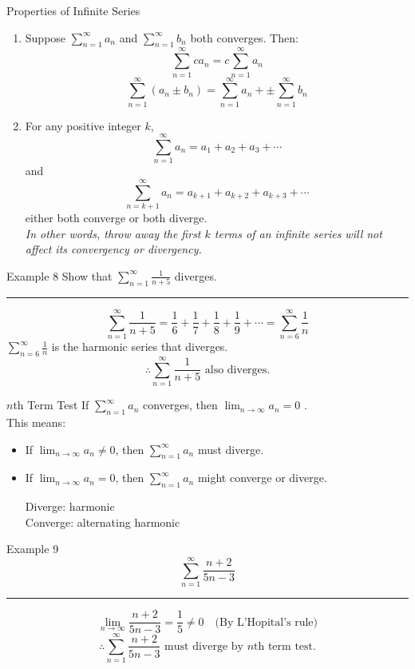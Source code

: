 \documentclass[12pt,a4paper]{article}
\begin{document}
\begin{thm}{Properties of Infinite Series}
	\begin{enumerate}
		\item Suppose $\displaystyle\sum^\infty_{n=1}a_n$ and $\displaystyle\sum^\infty_{n=1}b_n$ both converges. Then: $$\sum^\infty_{n=1}ca_n=c\sum^\infty_{n=1}a_n$$ $$\sum^\infty_{n=1}(a_n\pm b_n)=\sum^\infty_{n=1}a_n+\pm\sum^\infty_{n=1}b_n$$
		\item For any positive integer $k$, $$\sum^\infty_{n=1}a_n=a_1+a_2+a_3+\cdots$$ and $$\sum^\infty_{n=k+1}a_n=a_{k+1}+a_{k+2}+a_{k+3}+\cdots$$ either both converge or both diverge. \\
		\textit{In other words, throw away the first $k$ terms of an infinite series will not affect its convergency or divergency. }
	\end{enumerate}
\end{thm}
\begin{eg}{Example 8}
	Show that $\displaystyle\sum_{n=1}^\infty\frac{1}{n+5}$ diverges. \\
	\noindent\rule[0.25\baselineskip]{\textwidth}{1pt}
	$$\sum^\infty_{n=1}\frac{1}{n+5}=\frac{1}{6}+\frac{1}{7}+\frac{1}{8}+\frac{1}{9}+\cdots=\sum^\infty_{n=6}\frac{1}{n}$$	
	$\displaystyle\sum^\infty_{n=6}\frac{1}{n}$ is the harmonic series that diverges.
	$$\therefore\sum^\infty_{n=1}\frac{1}{n+5}\text{ also diverges.}$$
\end{eg}
\begin{thm}{$n$th Term Test}
	If $\displaystyle\sum^\infty_{n=1}a_n$ converges, then $\displaystyle\lim_{n\to\infty}a_n=0$	.\\
	This means:
	\begin{itemize}
		\item If $\displaystyle\lim_{n\to\infty}a_n\neq0$, then $\displaystyle\sum^\infty_{n=1}a_n$ must diverge.
		\item If $\displaystyle\lim_{n\to\infty}a_n=0$, then $\displaystyle\sum^\infty_{n=1}a_n$ might converge or diverge. \\
		\begin{eg}{ }
			Diverge: harmonic\\
			Converge: alternating harmonic	
		\end{eg}
	\end{itemize}
\end{thm}
\begin{eg}{Example 9}
	$$\sum^\infty_{n=1}\frac{n+2}{5n-3}$$
	\noindent\rule[0.25\baselineskip]{\textwidth}{1pt}
	$$\lim_{n\to\infty}\frac{n+2}{5n-3}=\frac{1}{5}\neq0\quad \text{(By L'Hopital's rule)}$$
	$$\therefore\sum^\infty_{n=1}\frac{n+2}{5n-3}\text{ must diverge by }n\text{th term test.}$$
\end{eg}
\end{document}

